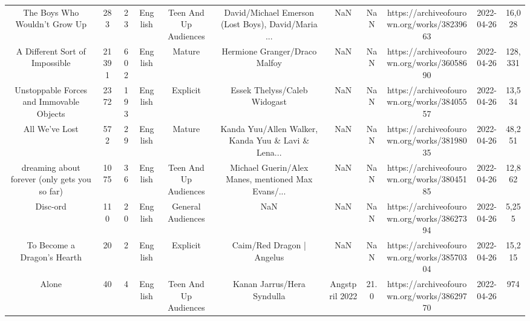 \begin{table}[h!]
{\begin{tabular}{|c|c|c|c|c|c|c|c|c|c|c|}
                     The Boys Who Wouldn't Grow Up &    283 &    23 &  English & Teen And Up Audiences & David/Michael Emerson (Lost Boys), David/Maria ... &                                                NaN &   NaN & https://archiveofourown.org/works/38239663 & 2022-04-26 &    16,028 \\
                    A Different Sort of Impossible &  21391 &   602 &  English &                Mature &                      Hermione Granger/Draco Malfoy &                                                NaN &   NaN & https://archiveofourown.org/works/36058690 & 2022-04-26 &   128,331 \\
          Unstoppable Forces and Immovable Objects &   2372 &   193 &  English &              Explicit &                       Essek Thelyss/Caleb Widogast &                                                NaN &   NaN & https://archiveofourown.org/works/38405557 & 2022-04-26 &    13,534 \\
                                    All We've Lost &    572 &    29 &  English &                Mature & Kanda Yuu/Allen Walker, Kanda Yuu \& Lavi \& Lena... &                                                NaN &   NaN & https://archiveofourown.org/works/38198035 & 2022-04-26 &    48,251 \\
     dreaming about forever (only gets you so far) &   1075 &    36 &  English & Teen And Up Audiences & Michael Guerin/Alex Manes, mentioned Max Evans/... &                                                NaN &   NaN & https://archiveofourown.org/works/38045185 & 2022-04-26 &    12,862 \\
                                          Disc-ord &    110 &    20 &  English &     General Audiences &                                                NaN &                                                NaN &   NaN & https://archiveofourown.org/works/38627394 & 2022-04-26 &     5,255 \\
                       To Become a Dragon's Hearth &     20 &     2 &  English &              Explicit &                          Caim/Red Dragon | Angelus &                                                NaN &   NaN & https://archiveofourown.org/works/38570304 & 2022-04-26 &    15,215 \\
                                             Alone &     40 &     4 &  English & Teen And Up Audiences &                         Kanan Jarrus/Hera Syndulla &                                     Angstpril 2022 &  21.0 & https://archiveofourown.org/works/38629770 & 2022-04-26 &       974 \\

\end{tabular}}
\end{table}

